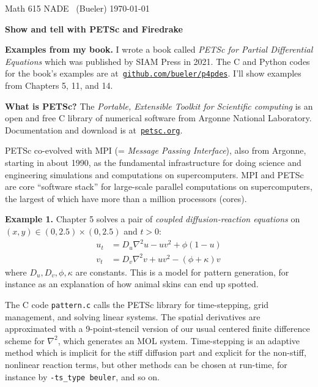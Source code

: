 \documentclass[12pt]{amsart}
\newcommand{\normalspacing}{\renewcommand{\baselinestretch}{1.05}
        \tiny\normalsize}
\newcommand{\grad}{\nabla}
\begin{document}
\scriptsize%
\noindent Math 615 NADE \, (Bueler) \hfill  \today
\normalsize\bigskip
\normalspacing

\Large\centerline{\textbf{Show and tell with \textbf{PETSc} and \textbf{Firedrake}}}
\normalsize

\bigskip
\thispagestyle{empty}
\normalspacing

\renewcommand{\labelenumi}{\arabic{enumi}.\,}


\bigskip
\noindent \textbf{Examples from my book.}  I wrote a book called \emph{PETSc for Partial Differential Equations} which was published by SIAM Press in 2021.  The C and Python codes for the book's examples are at \,\href{https://github.com/bueler/p4pdes}{\texttt{github.com/bueler/p4pdes}}.  I'll show examples from Chapters 5, 11, and 14.

\medskip
\noindent \textbf{What is PETSc?}  The \emph{Portable, Extensible Toolkit for Scientific computing} is an open and free C library of numerical software from Argonne National Laboratory.  Documentation and download is at \,\href{https://petsc.org/}{\texttt{petsc.org}}.

PETSc co-evolved with MPI (= \emph{Message Passing Interface}), also from Argonne, starting in about 1990, as the fundamental infrastructure for doing science and engineering simulations and computations on supercomputers.  MPI and PETSc are core ``software stack'' for large-scale parallel computations on supercomputers, the largest of which have more than a million processors (cores).

\bigskip
\noindent \textbf{Example 1.}  Chapter 5 solves a pair of \emph{coupled diffusion-reaction equations} on $(x,y) \in (0,2.5)\times (0,2.5)$ and $t>0$:
\begin{align*}
u_t &= D_u \grad^2 u - u v^2 + \phi (1 - u) \\
v_t &= D_v \grad^2 v + u v^2 - (\phi + \kappa) v
\end{align*}
where $D_u,D_v,\phi,\kappa$ are constants.  This is a model for pattern generation, for instance as an explanation of how animal skins can end up spotted.

The C code \texttt{pattern.c} calls the PETSc library for time-stepping, grid management, and solving linear systems.  The spatial derivatives are approximated with a 9-point-stencil version of our usual centered finite difference scheme for $\nabla^2$, which generates an MOL system.  Time-stepping is an adaptive method which is implicit for the stiff diffusion part and explicit for the non-stiff, nonlinear reaction terms, but other methods can be chosen at run-time, for instance by \texttt{-ts\_type beuler}, and so on.
\end{document}
